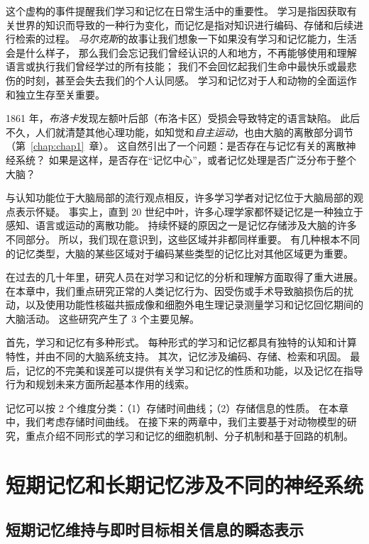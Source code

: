 这个虚构的事件提醒我们学习和记忆在日常生活中的重要性。
学习是指因获取有关世界的知识而导致的一种行为变化，而记忆是指对知识进行编码、存储和后续进行检索的过程。
\textit{马尔克斯}的故事让我们想象一下如果没有学习和记忆能力，生活会是什么样子，
那么我们会忘记我们曾经认识的人和地方，不再能够使用和理解语言或执行我们曾经学过的所有技能；
我们不会回忆起我们生命中最快乐或最悲伤的时刻，甚至会失去我们的个人认同感。
学习和记忆对于人和动物的全面运作和独立生存至关重要。


1861 年，\textit{布洛卡}发现左额叶后部（布洛卡区）受损会导致特定的语言缺陷。
此后不久，人们就清楚其他心理功能，如知觉和\textit{自主运动}，也由大脑的离散部分调节（第~\ref{chap:chap1}~章）。
这自然引出了一个问题：是否存在与记忆有关的离散神经系统？
如果是这样，是否存在“记忆中心”，或者记忆处理是否广泛分布于整个大脑？


与认知功能位于大脑局部的流行观点相反，许多学习学者对记忆位于大脑局部的观点表示怀疑。
事实上，直到 20 世纪中叶，许多心理学家都怀疑记忆是一种独立于感知、语言或运动的离散功能。
持续怀疑的原因之一是记忆存储涉及大脑的许多不同部分。
所以，我们现在意识到，这些区域并非都同样重要。
有几种根本不同的记忆类型，大脑的某些区域对于编码某些类型的记忆比对其他区域更为重要。


在过去的几十年里，研究人员在对学习和记忆的分析和理解方面取得了重大进展。
在本章中，我们重点研究正常的人类记忆行为、因受伤或手术导致脑损伤后的扰动，以及使用功能性核磁共振成像和细胞外电生理记录测量学习和记忆回忆期间的大脑活动。
这些研究产生了 3 个主要见解。


首先，学习和记忆有多种形式。
每种形式的学习和记忆都具有独特的认知和计算特性，并由不同的大脑系统支持。
其次，记忆涉及编码、存储、检索和巩固。
最后，记忆的不完美和误差可以提供有关学习和记忆的性质和功能，以及记忆在指导行为和规划未来方面所起基本作用的线索。


记忆可以按 2 个维度分类：（1）存储时间曲线；（2）存储信息的性质。
在本章中，我们考虑存储时间曲线。
在接下来的两章中，我们主要基于对动物模型的研究，重点介绍不同形式的学习和记忆的细胞机制、分子机制和基于回路的机制。



\section{短期记忆和长期记忆涉及不同的神经系统}

\subsection{短期记忆维持与即时目标相关信息的瞬态表示}

